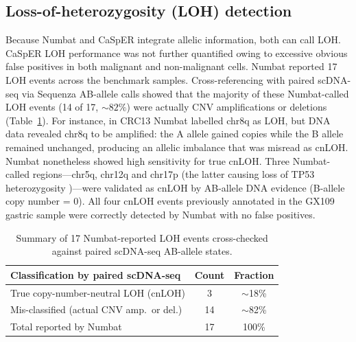 \documentclass[11pt]{article}
\begin{document}
\subsection{Loss-of-heterozygosity (LOH) detection}
Because Numbat and CaSpER integrate allelic information, both can call LOH. CaSpER LOH performance was not further quantified owing to excessive obvious false positives in both malignant and non-malignant cells. Numbat reported 17 LOH events across the benchmark samples. Cross-referencing with paired scDNA-seq via Sequenza AB-allele calls \citep{favero2015sequenza} showed that the majority of these Numbat-called LOH events (14 of 17, ${\sim}82\%$) were actually CNV amplifications or deletions (Table~\ref{tab:loh_summary}). For instance, in CRC13 Numbat labelled chr8q as LOH, but DNA data revealed chr8q to be amplified: the A allele gained copies while the B allele remained unchanged, producing an allelic imbalance that was misread as cnLOH. Numbat nonetheless showed high sensitivity for true cnLOH. Three Numbat-called regions---chr5q, chr12q and chr17p (the latter causing loss of TP53 heterozygosity \citep{olivier2010tp53})---were validated as cnLOH by AB-allele DNA evidence (B-allele copy number = 0). All four cnLOH events previously annotated in the GX109 gastric sample \citep{huang2023gastric} were correctly detected by Numbat with no false positives.

\begin{table}[ht]
\centering
\caption{Summary of 17 Numbat-reported LOH events cross-checked against paired scDNA-seq AB-allele states.}
\label{tab:loh_summary}
\begin{tabular}{lcc}
\toprule
Classification by paired scDNA-seq & Count & Fraction \\
\midrule
True copy-number-neutral LOH (cnLOH) & 3  & $\sim$18\% \\
Mis-classified (actual CNV amp.\ or del.) & 14 & $\sim$82\% \\
Total reported by Numbat & 17 & 100\% \\
\bottomrule
\end{tabular}
\end{table}
\end{document}
